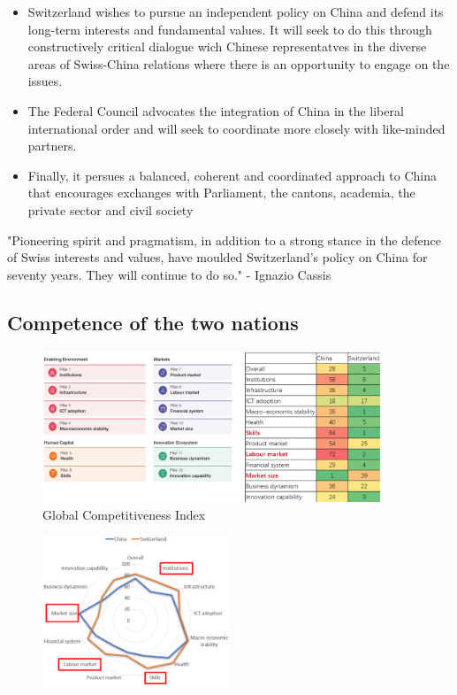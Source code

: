\begin{itemize}
    \item Switzerland wishes to pursue an independent policy on China and defend
        its long-term interests and fundamental values. It will seek to do this
        through constructively critical dialogue wich Chinese representatves
        in the diverse areas of Swiss-China relations where there is an
        opportunity to engage on the issues.
    \item The Federal Council advocates the integration of China in the liberal
        international order and will seek to coordinate more closely with
        like-minded partners.
    \item Finally, it persues a balanced, coherent and coordinated approach
        to China that encourages exchanges with Parliament, the cantons,
        academia, the private sector and civil society
\end{itemize}

"Pioneering spirit and pragmatism, in addition to a strong stance in the
defence of Swiss interests and values, have moulded Switzerland's policy
on China for seventy years. They will continue to do so." - Ignazio Cassis


\subsection{Competence of the two nations}

\begin{figure}[H]
    \centering
    \includegraphics[width=0.9\textwidth]{Pictures/global_competitiveness_index.png}
    \caption{Global Competitiveness Index}
\end{figure}

\begin{figure}[H]
    \centering
    \includegraphics[width=0.5\textwidth]{Pictures/china_switzerland_wef.png}
\end{figure}

